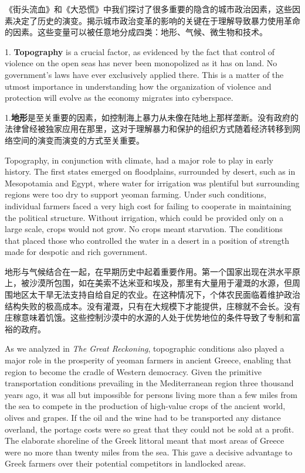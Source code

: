 \begin{Parallel}{97mm}{45mm}
  \ParallelRText
  {《街头流血》和《大恐慌》中我们探讨了很多重要的隐含的城市政治因素，这些因素决定了历史的演变。揭示城市政治变革的影响的关键在于理解导致暴力使用革命的因素。这些变量可以被任意地分成四类：地形、气候、微生物和技术。}
  \ParallelPar



  \ParallelLText
  {1. \textbf{Topography} is a crucial factor, as evidenced by the fact that control of violence on the open seas has never been monopolized as it has on land. No government's laws have ever exclusively applied there. This is a matter of the utmost importance in understanding how the organization of violence and protection will evolve as the economy migrates into cyberspace.}
  
  \ParallelRText
  {1.\textbf{地形}是至关重要的因素，如控制海上暴力从未像在陆地上那样垄断。没有政府的法律曾经被独家应用在那里，这对于理解暴力和保护的组织方式随着经济转移到网络空间的演变而演变的方式至关重要。}
  \ParallelPar


  \ParallelLText
  {Topography, in conjunction with climate, had a major role to play in early history. The first states emerged on floodplains, surrounded by desert, such as in Mesopotamia and Egypt, where water for irrigation was plentiful but surrounding regions were too dry to support yeoman farming. Under such conditions, individual farmers faced a very high cost for failing to cooperate in maintaining the political structure. Without irrigation, which could be provided only on a large scale, crops would not grow. No crops meant starvation. The conditions that placed those who controlled the water in a desert in a position of strength made for despotic and rich government.}
  
  \ParallelRText
  {地形与气候结合在一起，在早期历史中起着重要作用。第一个国家出现在洪水平原上，被沙漠所包围，如在美索不达米亚和埃及，那里有大量用于灌溉的水源，但周围地区太干旱无法支持自给自足的农业。在这种情况下，个体农民面临着维护政治结构失败的极高成本。没有灌溉，只有在大规模下才能提供，庄稼就不会长。没有庄稼意味着饥饿。这些控制沙漠中的水源的人处于优势地位的条件导致了专制和富裕的政府。}
  \ParallelPar


  \ParallelLText
  {As we analyzed in \emph{The Great Reckoning}, topographic conditions also played a major role in the prosperity of yeoman farmers in ancient Greece, enabling that region to become the cradle of Western democracy. Given the primitive transportation conditions prevailing in the Mediterranean region three thousand years ago, it was all but impossible for persons living more than a few miles from the sea to compete in the production of high-value crops of the ancient world, olives and grapes. If the oil and the wine had to be transported any distance overland, the portage costs were so great that they could not be sold at a profit. The elaborate shoreline of the Greek littoral meant that most areas of Greece were no more than twenty miles from the sea. This gave a decisive advantage to Greek farmers over their potential competitors in landlocked areas.}
  

\end{Parallel}
